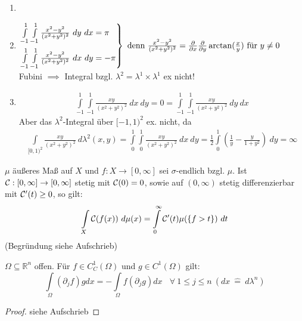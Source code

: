   \begin{example}
    \begin{enumerate}
      \item[]
      \item 
          $\begin{rcases}
            \int\limits_{-1}^1 \int\limits_{-1}^1 \frac{x^2-y^2}{(x^2+y^2)^2} \ dy \ dx = \pi\\
            \int\limits_{-1}^1 \int\limits_{-1}^1 \frac{x^2-y^2}{(x^2+y^2)^2} \ dx \ dy = -\pi
          \end{rcases} \text{ denn } \frac{x^2-y^2}{(x^2+y^2)^2} = \frac{\partial}{\partial x} \frac{\partial}{\partial y} \arctan(\frac{x}{y}) \text{ für } y \neq 0$\\
          Fubini $\implies$ Integral bzgl. $\lambda^2 = \lambda^1 \times \lambda^1$ ex nicht!
      \item
        \begin{align*}
          \int\limits_{-1}^1 \int\limits_{-1}^1 \frac{xy}{(x^2+y^2)^2} \ dx \ dy = 0 = \int\limits_{-1}^1 \int\limits_{-1}^1 \frac{xy}{(x^2+y^2)^2} \ dy \ dx
        \end{align*}
        Aber das $\lambda^2$-Integral über $[-1,1)^2$ ex. nicht, da
        \begin{align*}
          \int\limits_{[0,1)^2} \frac{xy}{(x^2+y^2)^2} \ d\lambda^2(x,y) = \int\limits_0^1 \int\limits_0^1 \frac{xy}{(x^2+y^2)^2} \ dx \ dy = \frac{1}{2} \int\limits_0^1 (\frac{1}{y} - \frac{y}{1+y^2}) \ dy = \infty
        \end{align*}
    \end{enumerate}
  \end{example}

  \begin{example}
    $\mu$ äußeres Maß auf $X$ und $f: X \to [0, \infty]$ sei $\sigma$-endlich bzgl. $\mu$. Ist $\mathcal{C}:[0,\infty] \to [0, \infty]$ stetig mit $\mathcal{C}(0) = 0$, sowie auf $(0, \infty)$ stetig differenzierbar mit $\mathcal{C}'(t)\geq0$, so gilt:
    \begin{align*}
      \int\limits_X \mathcal{C}(f(x)) \ d\mu(x) = \int\limits_0^{\infty} \mathcal{C}'(t) \mu(\{f > t\}) \ dt
    \end{align*}
    (Begründung siehe Aufschrieb)
  \end{example}

  \begin{theorem}
    $\Omega \subseteq \mathbb{R}^n$ offen. Für $f \in C_C^1(\Omega)$ und $g \in C^1(\Omega)$ gilt:
    $$\int\limits_{\Omega}(\partial_j f)g dx = -\int\limits_{\Omega} f (\partial_j g) dx \ \ \ \ \forall \ 1 \leq j \leq n \ (dx \ \hat{=} \ d \lambda^n)$$
  \end{theorem}
  \begin{proof}
    siehe Aufschrieb
  \end{proof}

